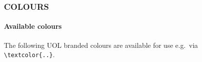\documentclass[
aspectratio=169,
]{beamer}
\begin{document}
\begin{frame}[t,fragile]
    \frametitle{COLOURS}
    \framesubtitle{Available colours}

    The following UOL branded colours are available
    for use e.g.\ via \verb|\textcolor{..}|.

    \medskip
    \begin{columns}[onlytextwidth]
        \begin{column}{0.25\textwidth}
        \end{column}
        \begin{column}{0.25\textwidth}
        \end{column}
        \begin{column}{0.25\textwidth}
        \end{column}
        \begin{column}{0.25\textwidth}
        \end{column}
    \end{columns}
\end{frame}
\end{document}
